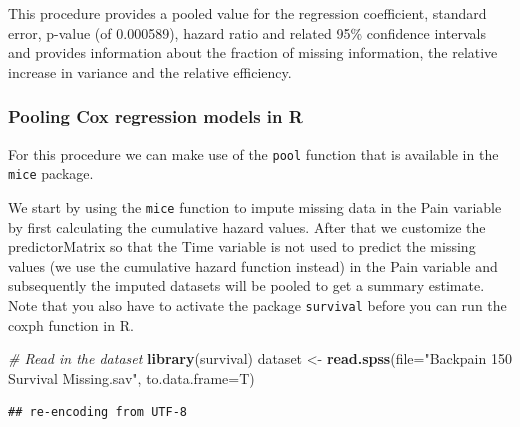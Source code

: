 \documentclass[]{book}
\newenvironment{Shaded}{\begin{snugshade}}{\end{snugshade}}
\newcommand{\KeywordTok}[1]{\textcolor[rgb]{0.13,0.29,0.53}{\textbf{#1}}}
\newcommand{\DataTypeTok}[1]{\textcolor[rgb]{0.13,0.29,0.53}{#1}}
\newcommand{\DecValTok}[1]{\textcolor[rgb]{0.00,0.00,0.81}{#1}}
\newcommand{\StringTok}[1]{\textcolor[rgb]{0.31,0.60,0.02}{#1}}
\newcommand{\CommentTok}[1]{\textcolor[rgb]{0.56,0.35,0.01}{\textit{#1}}}
\newcommand{\OperatorTok}[1]{\textcolor[rgb]{0.81,0.36,0.00}{\textbf{#1}}}
\newcommand{\NormalTok}[1]{#1}
\begin{document}
This procedure provides a pooled value for the regression coefficient,
standard error, p-value (of 0.000589), hazard ratio and related 95\%
confidence intervals and provides information about the fraction of
missing information, the relative increase in variance and the relative
efficiency.

\subsubsection{Pooling Cox regression models in
R}\label{pooling-cox-regression-models-in-r}

For this procedure we can make use of the \texttt{pool} function that is
available in the \texttt{mice} package.

We start by using the \texttt{mice} function to impute missing data in
the Pain variable by first calculating the cumulative hazard values.
After that we customize the predictorMatrix so that the Time variable is
not used to predict the missing values (we use the cumulative hazard
function instead) in the Pain variable and subsequently the imputed
datasets will be pooled to get a summary estimate. Note that you also
have to activate the package \texttt{survival} before you can run the
coxph function in R.

\begin{Shaded}
\begin{Highlighting}[]
\CommentTok{# Read in the dataset}
\KeywordTok{library}\NormalTok{(survival)}
\NormalTok{dataset <-}\StringTok{ }\KeywordTok{read.spss}\NormalTok{(}\DataTypeTok{file=}\StringTok{"Backpain 150 Survival Missing.sav"}\NormalTok{, }\DataTypeTok{to.data.frame=}\NormalTok{T)}
\end{Highlighting}
\end{Shaded}

\begin{verbatim}
## re-encoding from UTF-8
\end{verbatim}

\begin{Shaded}
\end{Shaded}
\end{document}
